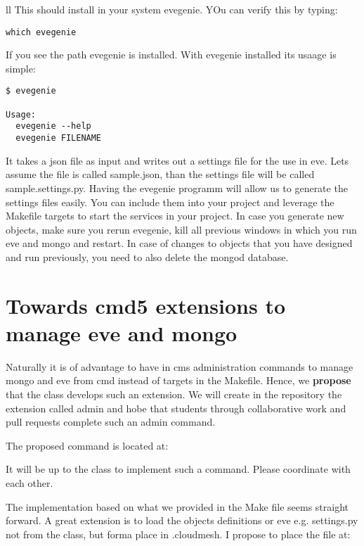 \begin{tabular}{ll}
This should install in your system evegenie. YOu can verify this by
typing:

\begin{lstlisting}
which evegenie
\end{lstlisting}

If you see the path evegenie is installed. With evegenie installed its
usaage is simple:

\begin{lstlisting}
$ evegenie

Usage:
  evegenie --help
  evegenie FILENAME
\end{lstlisting}

It takes a json file as input and writes out a settings file for the use
in eve. Lets assume the file is called sample.json, than the settings
file will be called sample.settings.py. Having the evegenie programm
will allow us to generate the settings files easily. You can include
them into your project and leverage the Makefile targets to start the
services in your project. In case you generate new objects, make sure
you rerun evegenie, kill all previous windows in which you run eve and
mongo and restart. In case of changes to objects that you have designed
and run previously, you need to also delete the mongod database.

\section{Towards cmd5 extensions to manage eve and
mongo}\label{towards-cmd5-extensions-to-manage-eve-and-mongo}

Naturally it is of advantage to have in cms administration commands to
manage mongo and eve from cmd instead of targets in the Makefile. Hence,
we \textbf{propose} that the class develops such an extension. We will
create in the repository the extension called admin and hobe that
students through collaborative work and pull requests complete such an
admin command.

The proposed command is located at:



It will be up to the class to implement such a command. Please
coordinate with each other.

The implementation based on what we provided in the Make file seems
straight forward. A great extension is to load the objects definitions
or eve e.g. settings.py not from the class, but forma place in
.cloudmesh. I propose to place the file at:


\end{tabular}
